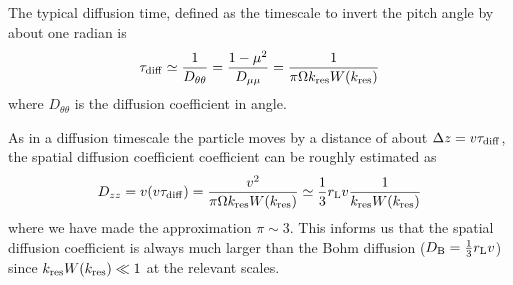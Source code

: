The typical diffusion time, defined as the timescale to invert the pitch angle by about one radian is
%
\begin{equation}
\tau_{\rm diff} \simeq \frac{1}{D_{\theta\theta}} = \frac{1-\mu^2}{D_{\mu\mu}} = \frac{1}{\pi \Omega k_{\rm res} W(k_{\rm res})}
\end{equation}
%
where $D_{\theta\theta}$ is the diffusion coefficient in angle.

As in a diffusion timescale the particle moves by a distance of about $\Delta z = v \tau_{\rm diff}$, the spatial diffusion coefficient coefficient can be roughly estimated as
%
\begin{equation}
D_{zz} = v (v \tau_{\rm diff}) = \frac{v^2}{\pi \Omega k_{\rm res} W(k_{\rm res})} \simeq \frac{1}{3} r_{\rm L} v \frac{1}{k_{\rm res} W(k_{\rm res})} 
\end{equation}
%
where we have made the approximation $\pi \sim 3$. This informs us that the spatial diffusion coefficient is always much larger than the Bohm diffusion ($D_{\rm B} = \frac{1}{3} r_{\rm L} v$) since $k_{\rm res} W(k_{\rm res}) \ll 1$ at the relevant scales.